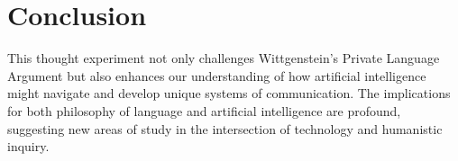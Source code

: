 \documentclass[12pt]{article}
\begin{document}
\section{Conclusion}
This thought experiment not only challenges Wittgenstein's Private Language Argument but also enhances our understanding of how artificial intelligence might navigate and develop unique systems of communication. The implications for both philosophy of language and artificial intelligence are profound, suggesting new areas of study in the intersection of technology and humanistic inquiry.
\end{document}
